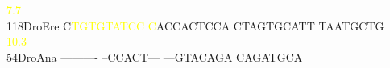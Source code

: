 \documentclass[11pt,twoside,reqno,a4paper]{article}
\begin{document}
{\hspace*{4\charwidth}\hspace*{7\charwidth}\hspace*{1\charwidth}\textcolor{yellow}{7.7}\hspace*{1\charwidth}\hspace*{1\charwidth}\hspace*{1\charwidth}\\
118\hspace*{1\charwidth}DroEre	C\textcolor{yellow}{T}\textcolor{yellow}{G}\textcolor{yellow}{T}\textcolor{yellow}{G}\textcolor{yellow}{T}\textcolor{yellow}{A}\textcolor{yellow}{T}\textcolor{yellow}{C}\textcolor{yellow}{C}	\textcolor{yellow}{C}ACCACTCCA	CTAGTGCATT	TAATGCTG\\
\hspace*{4\charwidth}\hspace*{7\charwidth}\hspace*{1\charwidth}\textcolor{yellow}{10.3}\hspace*{1\charwidth}\hspace*{1\charwidth}\hspace*{1\charwidth}\\
54\hspace*{2\charwidth}DroAna	----------	--CCACT---	---GTACAGA	CAGATGCA\\
\hspace*{4\charwidth}\hspace*{7\charwidth}\hspace*{1\charwidth}\hspace*{1\charwidth}\hspace*{1\charwidth}\\
\\
}
\end{document}
